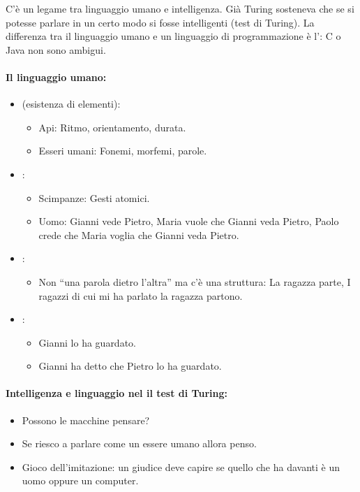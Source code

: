 C'è un legame tra linguaggio umano e intelligenza. Già Turing sosteneva che se si potesse parlare in un certo modo si fosse intelligenti (test di Turing). La differenza tra il linguaggio umano e un linguaggio di programmazione è l': C o Java non sono ambigui.

\paragraph{Il linguaggio umano:}

\begin{itemize}
  \item {} (esistenza di elementi): 
    \begin{itemize}
      \item Api: Ritmo, orientamento, durata. 
      \item Esseri umani: Fonemi, morfemi, parole.
    \end{itemize}
  \item {}: 
    \begin{itemize}
      \item Scimpanze: Gesti atomici. 
      \item Uomo: Gianni vede Pietro, Maria vuole che Gianni veda Pietro, Paolo crede che Maria voglia che Gianni veda Pietro.
    \end{itemize}
  \item {}: 
    \begin{itemize}
      \item Non “una parola dietro l'altra” ma c'è una struttura: La ragazza parte, I ragazzi di cui mi ha parlato la ragazza partono. 
    \end{itemize}
  \item {}: 
    \begin{itemize}
      \item Gianni lo ha guardato. 
      \item Gianni ha detto che Pietro lo ha guardato.
    \end{itemize}
\end{itemize}

\paragraph{Intelligenza e linguaggio nel il test di Turing:}

\begin{itemize}
  \item Possono le macchine pensare?
  \item Se riesco a parlare come un essere umano allora penso. 
  \item Gioco dell'imitazione: un giudice deve capire se quello che ha davanti è un uomo oppure un computer.
\end{itemize}

